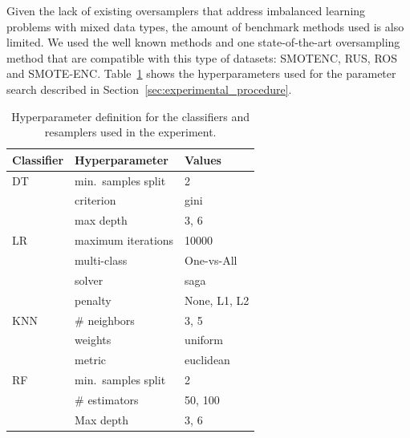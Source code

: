 \documentclass[parskip=full]{scrartcl}
\begin{document}
Given the lack of existing oversamplers that address imbalanced learning
problems with mixed data types, the amount of benchmark methods used is also
limited. We used the well known methods and one state-of-the-art oversampling
method that are compatible with this type of datasets: SMOTENC, RUS, ROS and
SMOTE-ENC.  Table~\ref{tbl:grid} shows the hyperparameters used for the
parameter search described in Section~\ref{sec:experimental_procedure}.

\begin{table}[ht]
	\centering
    \caption{\label{tbl:grid}
        Hyperparameter definition for the classifiers and resamplers used in
        the experiment.
    }
	\begin{tabular}{lll}
		\toprule
		Classifier      & Hyperparameter                   & Values                         \\
		\midrule
        DT              & min.\ samples split              & 2                              \\
                        & criterion                        & gini                           \\
                        & max depth                        & 3, 6                           \\
		LR              & maximum iterations               & 10000                          \\
                        & multi-class                      & One-vs-All                     \\
		                & solver                           & saga                           \\
                        & penalty                          & None, L1, L2                   \\
		KNN             & \# neighbors                     & 3, 5                           \\
                        & weights                          & uniform                        \\
                        & metric                           & euclidean                      \\
		RF              & min.\ samples split              & 2                              \\
		                & \# estimators                    & 50, 100                        \\
		                & Max depth                        & 3, 6                           \\

\end{tabular}
\end{table}
\end{document}
